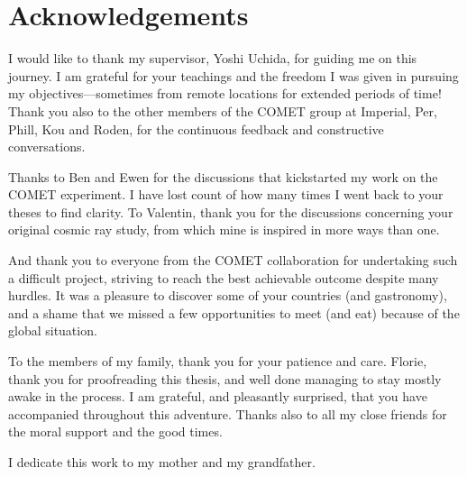 \chapter*{Acknowledgements}

I would like to thank my supervisor, Yoshi Uchida, for guiding me on this
journey. I am grateful for your teachings and the freedom I was given in
pursuing my objectives---sometimes from remote locations for extended periods of
time! Thank you also to the other members of the COMET group at Imperial, Per,
Phill, Kou and Roden, for the continuous feedback and constructive
conversations. 

Thanks to Ben and Ewen for the discussions that kickstarted my work on the COMET
experiment. I have lost count of how many times I went back to your theses to
find clarity.
To Valentin, thank you for the discussions concerning your original cosmic ray
study, from which mine is inspired in more ways than one.

And thank you to everyone from the COMET collaboration for undertaking such a
difficult project, striving to reach the best achievable outcome despite many
hurdles. It was a pleasure to discover some of your countries (and gastronomy),
and a shame that we missed a few opportunities to meet (and eat) because of the
global situation.


To the members of my family, thank you for your patience and care. Florie, thank
you for proofreading this thesis, and well done managing to stay mostly awake in
the process. I am grateful, and pleasantly surprised, that you have accompanied
throughout this adventure. Thanks also to all my close friends for the moral
support and the good times.

I dedicate this work to my mother and my grandfather.

